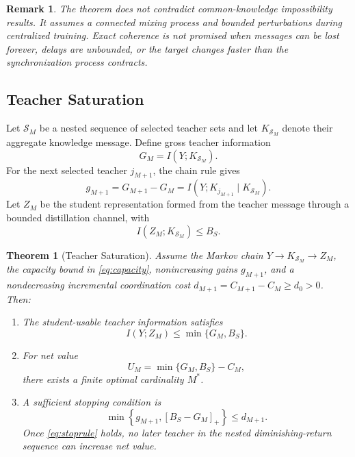 \documentclass[10pt,twocolumn,a4paper]{article}
\newtheorem{theorem}{Theorem}
\newtheorem{remark}{Remark}
\newcommand{\cS}{\mathcal{S}}
\begin{document}
\begin{remark}
The theorem does not contradict common-knowledge impossibility results. It assumes a connected mixing process and bounded perturbations during centralized training. Exact coherence is not promised when messages can be lost forever, delays are unbounded, or the target changes faster than the synchronization process contracts.
\end{remark}

\subsection{Teacher Saturation}

Let \(\cS_M\) be a nested sequence of selected teacher sets and let \(K_{\cS_M}\) denote their aggregate knowledge message. Define gross teacher information
\begin{equation}
 G_M=I(Y;K_{\cS_M}).
\label{eq:grossinfo}
\end{equation}
For the next selected teacher \(j_{M+1}\), the chain rule gives
\begin{equation}
 g_{M+1}=G_{M+1}-G_M
 =I(Y;K_{j_{M+1}}\mid K_{\cS_M}).
\label{eq:conditionalgain}
\end{equation}
Let \(Z_M\) be the student representation formed from the teacher message through a bounded distillation channel, with
\begin{equation}
 I(Z_M;K_{\cS_M})\le B_S.
\label{eq:capacity}
\end{equation}

\begin{theorem}[Teacher Saturation]
\label{thm:saturation}
Assume the Markov chain \(Y\to K_{\cS_M}\to Z_M\), the capacity bound in \cref{eq:capacity}, nonincreasing gains \(g_{M+1}\), and a nondecreasing incremental coordination cost \(d_{M+1}=C_{M+1}-C_M\ge d_0>0\). Then:

\begin{enumerate}
    \item The student-usable teacher information satisfies
    \begin{equation}
    I(Y;Z_M)\le \min\{G_M,B_S\}.
    \label{eq:usableinfo}
    \end{equation}
    \item For net value
    \begin{equation}
    U_M=\min\{G_M,B_S\}-C_M,
    \label{eq:netutility}
    \end{equation}
    there exists a finite optimal cardinality \(M^*\).
    \item A sufficient stopping condition is
    \begin{equation}
    \min\left\{g_{M+1},[B_S-G_M]_+\right\}\le d_{M+1}.
    \label{eq:stoprule}
    \end{equation}
    Once \cref{eq:stoprule} holds, no later teacher in the nested diminishing-return sequence can increase net value.
\end{enumerate}
\end{theorem}
\end{document}
